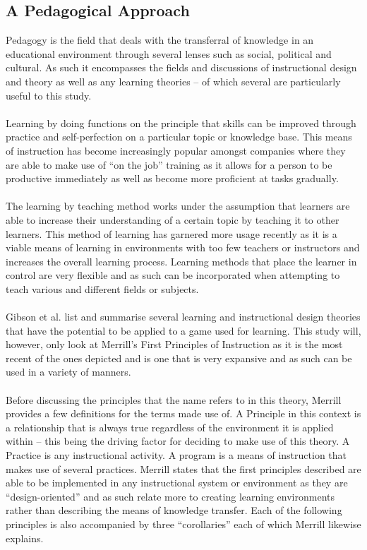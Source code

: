 \documentclass[conference]{IEEEtran}
\begin{document}
\subsection{A Pedagogical Approach}
Pedagogy is the field that deals with the transferral of knowledge in an educational environment through several lenses such as social, political and cultural\cite{Li2012}. As such it encompasses the fields and discussions of instructional design and theory as well as any learning theories – of which several are particularly useful to this study.
\\\\
Learning by doing functions on the principle that skills can be improved through practice and self-perfection on a particular topic or knowledge base\cite{Fisch2009}. This means of instruction has become increasingly popular amongst companies where they are able to make use of “on the job” training as it allows for a person to be productive immediately as well as become more proficient at tasks gradually\cite{Fisch2009}. 
\\\\
The learning by teaching method works under the assumption that learners are able to increase their understanding of a certain topic by teaching it to other learners\cite{Fisch2009}. This method of learning has garnered more usage recently as it is a viable means of learning in environments with too few teachers or instructors and increases the overall learning process\cite{Fisch2009}. Learning methods that place the learner in control are very flexible and as such can be incorporated when attempting to teach various and different fields or subjects\cite{Ackoff1991}. 
\\\\
Gibson et al.\cite{gibson2006games} list and summarise several learning and instructional design theories that have the potential to be applied to a game used for learning. This study will, however, only look at Merrill’s First Principles of Instruction as it is the most recent of the ones depicted and is one that is very expansive and as such can be used in a variety of manners\cite{gibson2006games}.
\\\\
Before discussing the principles that the name refers to in this theory, Merrill\cite{Merrill2002} provides a few definitions for the terms made use of. A Principle in this context is a relationship that is always true regardless of the environment it is applied within – this being the driving factor for deciding to make use of this theory\cite{Merrill2002}. A Practice is any instructional activity\cite{Merrill2002}. A program is a means of instruction that makes use of several practices\cite{Merrill2002}. Merrill\cite{Merrill2002} states that the first principles described are able to be implemented in any instructional system or environment as they are “design-oriented” and as such relate more to creating learning environments rather than describing the means of knowledge transfer. Each of the following principles is also accompanied by three “corollaries” each of which Merrill\cite{Merrill2002} likewise explains.
\end{document}
